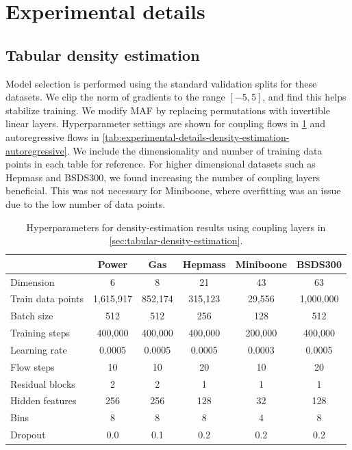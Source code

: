 \section{Experimental details}
\label{appendix:experimental-details}

\subsection{Tabular density estimation}
\label{appendix:experimental-details-tabular-density-estimation}

Model selection is performed using the standard validation splits for these datasets.
We clip the norm of gradients to the range $ [-5, 5] $, and find this helps stabilize training.
We modify MAF by replacing permutations with invertible linear layers.
Hyperparameter settings are shown for coupling flows in \cref{tab:experimental-details-density-estimation-coupling} and autoregressive flows in \cref{tab:experimental-details-density-estimation-autoregressive}.
We include the dimensionality and number of training data points in each table for reference. 
For higher dimensional datasets such as Hepmass and BSDS300, we found increasing the number of coupling layers beneficial. 
This was not necessary for Miniboone, where overfitting was an issue due to the low number of data points.

\begin{table}[!ht]
	\caption{Hyperparameters for density-estimation results using coupling layers in \cref{sec:tabular-density-estimation}.}
	\label{tab:experimental-details-density-estimation-coupling}
    \vspace*{-0.1in}
	\begin{center}
		\begin{small}
			\begin{sc}
				\begin{tabular}{lccccc}
					\toprule
					& Power & Gas & Hepmass & Miniboone & BSDS300 \\ 
					\midrule
					Dimension & 6 & 8 & 21 & 43 & 63 \\
					Train data points & 1,615,917 & 852,174 & 315,123 & 29,556 & 1,000,000 \\
					\midrule
					Batch size & 512 & 512 & 256 & 128 & 512 \\
					Training steps & 400,000 & 400,000 & 400,000 & 200,000 & 400,000 \\
					Learning rate & 0.0005 & 0.0005 & 0.0005 & 0.0003 & 0.0005 \\
					Flow steps & 10 & 10 & 20 & 10 & 20 \\
					Residual blocks & 2 & 2 & 1 & 1 & 1 \\
					Hidden features & 256 & 256 & 128 & 32 & 128 \\
					Bins & 8 & 8 & 8 & 4 & 8 \\
					Dropout & 0.0 & 0.1 & 0.2 & 0.2 & 0.2 \\
					\bottomrule
				\end{tabular}
			\end{sc}
		\end{small}
	\end{center}
\end{table}

